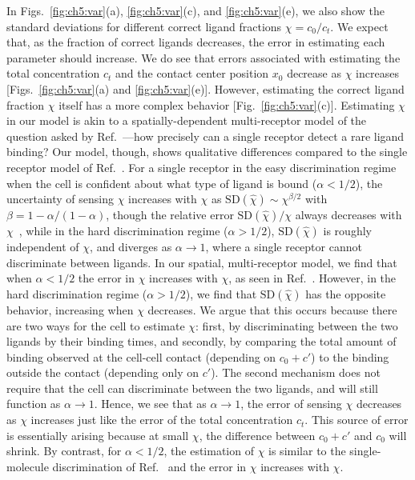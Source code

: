 In Figs.~\ref{fig:ch5:var}(a), \ref{fig:ch5:var}(c), and \ref{fig:ch5:var}(e), we also show the standard deviations for different correct ligand fractions $\chi=c_0/c_t$.
We expect that, as the fraction of correct ligands decreases, the error in estimating each parameter should increase.
We do see that errors associated with estimating the total concentration $c_t$ and the contact center position $x_0$ decrease as $\chi$ increases [Figs.~\ref{fig:ch5:var}(a) and \ref{fig:ch5:var}(e)].
However, estimating the correct ligand fraction $\chi$ itself has a more complex behavior [Fig.~\ref{fig:ch5:var}(c)].
Estimating $\chi$ in our model is akin to a spatially-dependent multi-receptor model of the question asked by Ref.~\cite{mora2015physical}---how precisely can a single receptor detect a rare ligand binding?
Our model, though, shows qualitative differences compared to the single receptor model of Ref.~\cite{mora2015physical}.
For a single receptor in the easy discrimination regime when the cell is confident about what type of ligand is bound ($\alpha<1/2$), the uncertainty of sensing $\chi$ increases with $\chi$ as $\textrm{SD}(\hat{\chi}) \sim \chi^{\beta/2}$ with $\beta = 1-\alpha/(1-\alpha)$, though the relative error $\textrm{SD}(\hat{\chi})/\chi$ always decreases with $\chi$~\cite{mora2015physical}, while in the hard discrimination regime ($\alpha > 1/2$), $\textrm{SD}(\hat{\chi})$ is roughly independent of $\chi$, and diverges as $\alpha \to 1$, where a single receptor cannot discriminate between ligands.
In our spatial, multi-receptor model, we find that when $\alpha < 1/2$ the error in $\chi$ increases with $\chi$, as seen in Ref.~\cite{mora2015physical}.
However, in the hard discrimination regime ($\alpha>1/2$), we find that $\textrm{SD}(\hat{\chi})$ has the opposite behavior, increasing when $\chi$ decreases.
We argue that this occurs because there are two ways for the cell to estimate $\chi$: first, by discriminating between the two ligands by their binding times, and secondly, by comparing the total amount of binding observed at the cell-cell contact (depending on $c_0 + c'$) to the binding outside the contact (depending only on $c'$).
The second mechanism does not require that the cell can discriminate between the two ligands, and will still function as $\alpha \to 1$.
Hence, we see that as $\alpha \to 1$, the error of sensing $\chi$ decreases as $\chi$ increases just like the error of the total concentration $c_t$.
This source of error is essentially arising because at small $\chi$, the difference between $c_0 + c'$ and $c_0$ will shrink.
By contrast, for $\alpha < 1/2$, the estimation of $\chi$ is similar to the single-molecule discrimination of Ref.~\cite{mora2015physical} and the error in $\chi$ increases with $\chi$.


